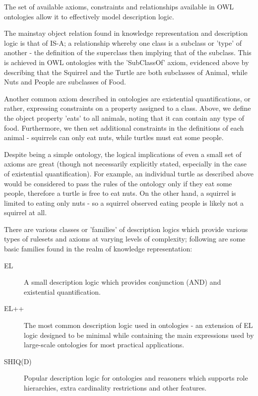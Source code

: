 \documentclass{article}
\begin{document}
The set of available axioms, constraints and relationships available in OWL
ontologies allow it to effectively model description logic\cite{desclogic}. 

The mainstay object relation found in knowledge representation and description
logic is that of IS-A; a relationship whereby one class is a subclass or 'type'
of another - the definition of the superclass then implying that of the
subclass. This is achieved in OWL ontologies with the 'SubClassOf' axiom,
evidenced above by describing that the Squirrel and the Turtle are both
subclasses of Animal, while Nuts and People are subclasses of Food. 

Another common axiom described in ontologies are existential quantifications, or
rather, expressing constraints on a property assigned to a class. Above, we
define the object property 'eats' to all animals, noting that it can contain any
type of food. Furthermore, we then set additional constraints in the definitions
of each animal - squirrels can only eat nuts, while turtles must eat some
people.

Despite being a simple ontology, the logical implications of even a small set of
axioms are great (though not necessarily explicitly stated, especially in the
case of existential quantification). For example, an individual turtle as described 
above would be considered to pass the rules of the ontology only if they eat some 
people, therefore a turtle is free to eat nuts. On the other hand, a squirrel is limited
to eating only nuts - so a squirrel observed eating people is likely not a
squirrel at all.

There are
various classes or 'families' of description logics which provide various types
of rulesets and axioms at varying levels of complexity; following are some basic 
families found in the realm of knowledge representation:

\begin{description}
    \item[EL] A small description logic which provides conjunction (AND) and
    existential quantification.
    \item[EL++] The most common description logic used in ontologies - an
    extension of EL logic designed to be minimal while containing the main 
    expressions used by large-scale ontologies for most practical 
    applications.\cite{elplusplus}
    \item[SHIQ(D)] Popular description logic for ontologies and reasoners which
    supports role hierarchies, extra cardinality restrictions and other
    features. 
\end{description}
\end{document}
